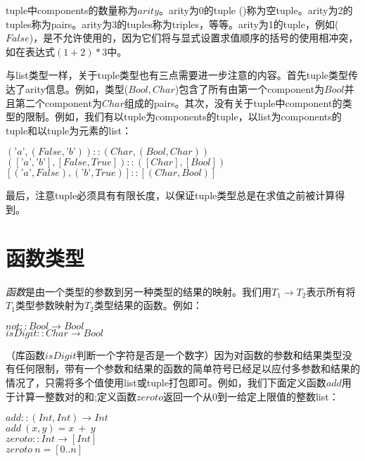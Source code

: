 tuple中components的数量称为$arity$。arity为0的tuple
()称为空tuple。arity为2的tuples称为pairs。arity为3的tuples称为triples，等等。arity为1的tuple，例如($False$)，是不允许使用的，因为它们将与显式设置求值顺序的括号的使用相冲突，如在表达式$(1
+ 2) * 3$中。

与list类型一样，关于tuple类型也有三点需要进一步注意的内容。首先tuple类型传达了arity信息。例如，类型($Bool,
Char$)包含了所有由第一个component为$Bool$并且第二个component为$Char$组成的pairs。其次，没有关于tuple中component的类型的限制。例如，我们有以tuple为components的tuple，以list为components的tuple和以tuple为元素的list：

\noindent\hspace*{1cm} $(’a’, (False, ’b’)) :: (Char , (Bool , Char ))$\\
\hspace*{1cm} $([’a’, ’b’], [False, True ]) :: ([Char ], [Bool ])$\\
\hspace*{1cm} $[(’a’, False), (’b’, True)] :: [(Char , Bool )]$

最后，注意tuple必须具有有限长度，以保证tuple类型总是在求值之前被计算得到。

\section{函数类型}
\textit{函数}是由一个类型的参数到另一种类型的结果的映射。我们用$T_1
\rightarrow T_2$表示所有将$T_1$类型参数映射为$T_2$类型结果的函数。例如：

\noindent\hspace*{1cm} $not :: Bool \rightarrow Bool$\\
\hspace*{1cm} $isDigit :: Char \rightarrow Bool$

（库函数$isDigit$判断一个字符是否是一个数字）因为对函数的参数和结果类型没有任何限制，带有一个参数和结果的函数的简单符号已经足以应付多参数和结果的情况了，只需将多个值使用list或tuple打包即可。例如，我们下面定义函数$add$用于计算一整数对的和;定义函数$zeroto$返回一个从$0$到一给定上限值的整数list：

\noindent\hspace*{1cm} $add :: (Int, Int) \rightarrow Int$\\
\hspace*{1cm} $add~(x , y) = x~+~y$\\
\hspace*{1cm} $zeroto :: Int \rightarrow [Int]$\\
\hspace*{1cm} $zeroto~n = [0 . . n ]$

